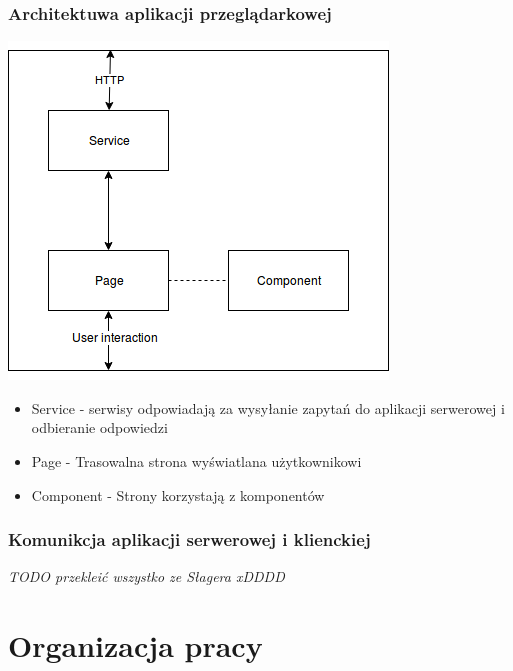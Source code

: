 \documentclass[polish,12pt]{aghthesis}
\begin{document}
\subsubsection{Architektuwa aplikacji przeglądarkowej}
\includegraphics[width=\textwidth]{front-schema}
\begin{itemize}
    \item Service - serwisy odpowiadają za wysyłanie zapytań do aplikacji serwerowej i odbieranie odpowiedzi
    \item Page - Trasowalna strona wyświatlana użytkownikowi
    \item Component - Strony korzystają z komponentów
\end{itemize}

\subsubsection{Komunikcja aplikacji serwerowej i klienckiej}
\emph{TODO przekleić wszystko ze Słagera xDDDD}


\section{Organizacja pracy}
\label{sec:organizacja-pracy}
\end{document}
